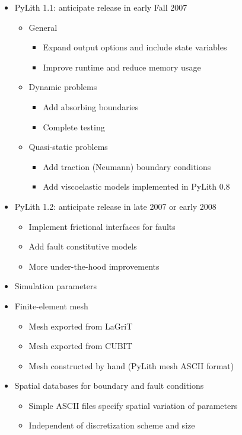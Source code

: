 \documentclass[pdftex,cig,slideColor]{pp4slides}
\begin{document}
  \begin{itemize}
  \item PyLith 1.1: anticipate release in early Fall 2007
    \begin{itemize}
    \item General
      \begin{itemize}
      \item Expand output options and include state variables
      \item Improve runtime and reduce memory usage
      \end{itemize}
    \item Dynamic problems
      \begin{itemize}
      \item Add absorbing boundaries
      \item Complete testing
      \end{itemize}
    \item Quasi-static problems
      \begin{itemize}
      \item Add traction (Neumann) boundary conditions
      \item Add viscoelastic models implemented in PyLith 0.8
      \end{itemize}
    \end{itemize}
  \item PyLith 1.2: anticipate release in late 2007 or early 2008
    \begin{itemize}
    \item Implement frictional interfaces for faults
    \item Add fault constitutive models
    \item More under-the-hood improvements
    \end{itemize}
  \end{itemize}


  \begin{itemize}
  \item Simulation parameters
  \item Finite-element mesh
    \begin{itemize}
    \item Mesh exported from LaGriT
    \item Mesh exported from CUBIT
    \item Mesh constructed by hand (PyLith mesh ASCII format)
    \end{itemize}
  \item Spatial databases for boundary and fault conditions
    \begin{itemize}
    \item Simple ASCII files specify spatial variation of parameters
    \item Independent of discretization scheme and size
    \end{itemize}
  \end{itemize}
                                
\end{document}
